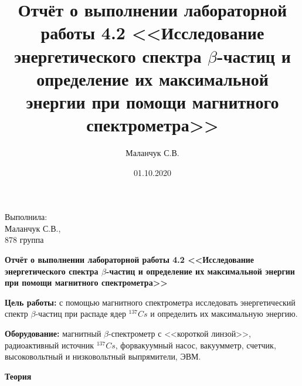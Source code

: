 \documentclass[12pt]{article}
\title{Отчёт о выполнении лабораторной работы 4.2 <<Исследование энергетического
  спектра $\beta$-частиц и определение их максимальной энергии при помощи
  магнитного спектрометра>>}
\author{Маланчук С.В.}
\date{01.10.2020}
\begin{document}
\begin{flushright}
    Выполнила:
    \\
    Маланчук С.В.,
    \\
    878 группа
\end{flushright}

\begin{center}
    \begin{Large}
        \textbf{Отчёт о выполнении лабораторной работы 4.2 <<Исследование энергетического
  спектра $\beta$-частиц и определение их максимальной энергии при помощи
  магнитного спектрометра>>}
    \end{Large}
\end{center}


\parindent=1cm \textbf{Цель работы:} с помощью магнитного спектрометра
исследовать энергетический спектр $\beta$-частиц при распаде ядер $^{137}Cs$ и
определить их максимальную энергию.

\parindent=1cm \textbf{Оборудование:} магнитный $\beta$-спектрометр с <<короткой
линзой>>, радиоактивный источник $^{137}Cs$, форвакуумный насос, вакуумметр, счетчик,
высоковольтный и низковольтный выпрямители, ЭВМ.
\begin{center}
    \textbf{Теория}
\end{center}
\end{document}
